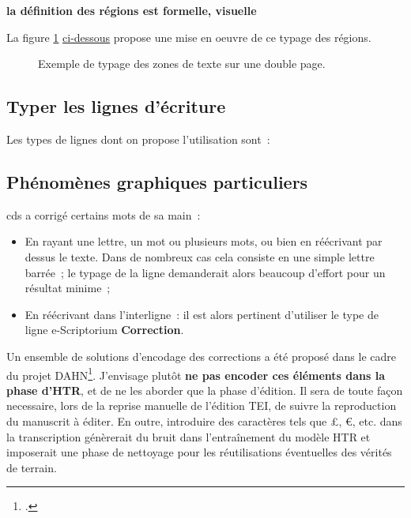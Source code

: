 \documentclass[a4paper,12pt,twoside]{book}
\begin{document}
				\textbf{la définition des régions est formelle, visuelle}
			
			La figure \ref{typageRegions} \hyperref[typageRegions]{ci-dessous} propose une mise en oeuvre de ce typage des régions.	
			
			\begin{figure}[!h]
				\centering
				\caption{Exemple de typage des zones de texte sur une double page.}%
				\label{typageRegions}%
			\end{figure}
			
			\subsection{Typer les lignes d'écriture}
				Les types de lignes dont on propose l'utilisation sont~:
						
			\subsection{Phénomènes graphiques particuliers}
				\gls{cds} a corrigé certains mots de sa main~:
			
				\begin{itemize}
					\item En rayant une lettre, un mot ou plusieurs mots, ou bien en réécrivant par dessus le texte. Dans de nombreux cas cela consiste en une simple lettre barrée~; le typage de la ligne demanderait alors beaucoup d'effort pour un résultat minime~;
					\item En réécrivant dans l'interligne~: il est alors pertinent d'utiliser le type de ligne e-Scriptorium \textbf{Correction}.
				\end{itemize}
				
				Un ensemble de solutions d'encodage des corrections a été proposé dans le cadre du projet DAHN\footcite{chiffoleauFewTipsReading}. J'envisage plutôt \textbf{ne pas encoder ces éléments dans la phase d'HTR}, et de ne les aborder que la phase d'édition. Il sera de toute façon necessaire, lors de la reprise manuelle de l'édition TEI, de suivre la reproduction du manuscrit à éditer. En outre, introduire des caractères tels que £, €, etc. dans la transcription génèrerait du bruit dans l'entraînement du modèle HTR et imposerait une phase de nettoyage pour les réutilisations éventuelles des vérités de terrain.
				
\end{document}
